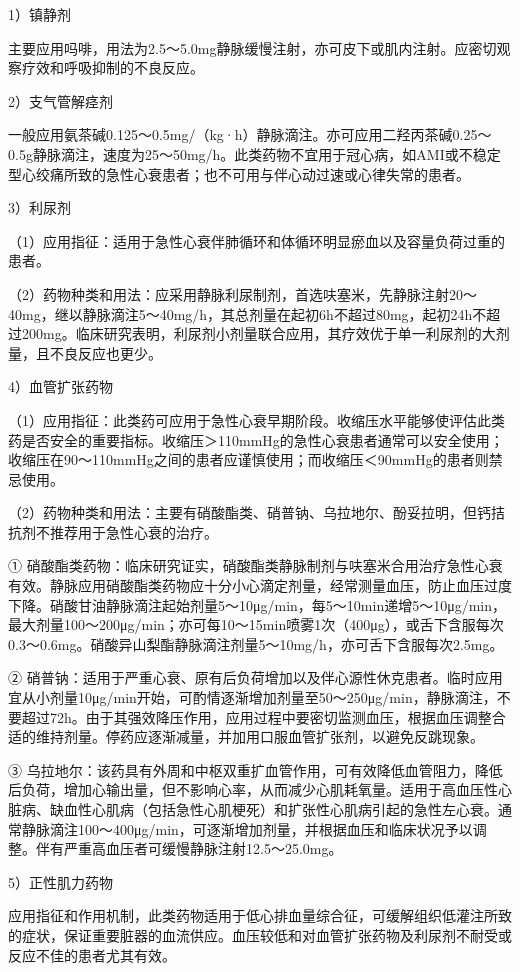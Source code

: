 1）镇静剂

主要应用吗啡，用法为2.5～5.0mg静脉缓慢注射，亦可皮下或肌内注射。应密切观察疗效和呼吸抑制的不良反应。

2）支气管解痉剂

一般应用氨茶碱0.125～0.5mg/（kg·h）静脉滴注。亦可应用二羟丙茶碱0.25～0.5g静脉滴注，速度为25～50mg/h。此类药物不宜用于冠心病，如AMI或不稳定型心绞痛所致的急性心衰患者；也不可用与伴心动过速或心律失常的患者。

3）利尿剂

（1）应用指征：适用于急性心衰伴肺循环和体循环明显瘀血以及容量负荷过重的患者。

（2）药物种类和用法：应采用静脉利尿制剂，首选呋塞米，先静脉注射20～40mg，继以静脉滴注5～40mg/h，其总剂量在起初6h不超过80mg，起初24h不超过200mg。临床研究表明，利尿剂小剂量联合应用，其疗效优于单一利尿剂的大剂量，且不良反应也更少。

4）血管扩张药物

（1）应用指征：此类药可应用于急性心衰早期阶段。收缩压水平能够使评估此类药是否安全的重要指标。收缩压＞110mmHg的急性心衰患者通常可以安全使用；收缩压在90～110mmHg之间的患者应谨慎使用；而收缩压＜90mmHg的患者则禁忌使用。

（2）药物种类和用法：主要有硝酸酯类、硝普钠、乌拉地尔、酚妥拉明，但钙拮抗剂不推荐用于急性心衰的治疗。

①
硝酸酯类药物：临床研究证实，硝酸酯类静脉制剂与呋塞米合用治疗急性心衰有效。静脉应用硝酸酯类药物应十分小心滴定剂量，经常测量血压，防止血压过度下降。硝酸甘油静脉滴注起始剂量5～10μg/min，每5～10min递增5～10μg/min，最大剂量100～200μg/min；亦可每10～15min喷雾1次（400μg），或舌下含服每次0.3～0.6mg。硝酸异山梨酯静脉滴注剂量5～10mg/h，亦可舌下含服每次2.5mg。

②
硝普钠：适用于严重心衰、原有后负荷增加以及伴心源性休克患者。临时应用宜从小剂量10μg/min开始，可酌情逐渐增加剂量至50～250μg/min，静脉滴注，不要超过72h。由于其强效降压作用，应用过程中要密切监测血压，根据血压调整合适的维持剂量。停药应逐渐减量，并加用口服血管扩张剂，以避免反跳现象。

③
乌拉地尔：该药具有外周和中枢双重扩血管作用，可有效降低血管阻力，降低后负荷，增加心输出量，但不影响心率，从而减少心肌耗氧量。适用于高血压性心脏病、缺血性心肌病（包括急性心肌梗死）和扩张性心肌病引起的急性左心衰。通常静脉滴注100～400μg/min，可逐渐增加剂量，并根据血压和临床状况予以调整。伴有严重高血压者可缓慢静脉注射12.5～25.0mg。

5）正性肌力药物

应用指征和作用机制，此类药物适用于低心排血量综合征，可缓解组织低灌注所致的症状，保证重要脏器的血流供应。血压较低和对血管扩张药物及利尿剂不耐受或反应不佳的患者尤其有效。

